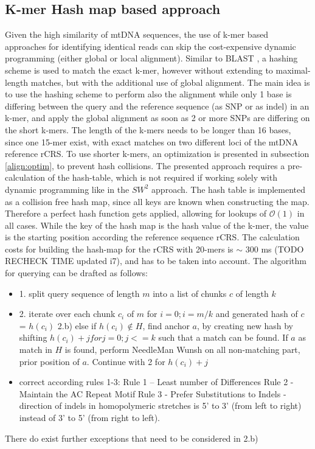 \subsection{K-mer Hash map based approach}
Given the high similarity of mtDNA sequences, the use of k-mer based approaches for identifying identical reads can skip the cost-expensive dynamic programming (either global or local alignment). Similar to BLAST \cite{Altschul1990}, a hashing scheme is used to match the exact k-mer, however without extending to maximal-length matches, but with the additional use of global alignment. The main idea is to use the hashing scheme to perform also the alignment while only 1 base is differing between the query and the reference sequence (as SNP or as indel) in an k-mer, and apply the global alignment as soon as 2 or more SNPs are differing on the short k-mers. The length of the k-mers needs to be longer than 16 bases, since one 15-mer exist, with exact matches on two different loci of the mtDNA reference rCRS. To use shorter k-mers, an optimization is presented in subsection \ref{align:optim}, to prevent hash collisions.
The presented approach requires a pre-calculation of the hash-table, which is not required if working solely with dynamic programming like in the $SW^{2}$ approach.
The hash table is implemented as a collision free hash map, since all keys are known when constructing the map. Therefore a perfect hash function gets applied, allowing for lookups of $\mathcal{O}(1)$ in all cases. While the key of the hash map is the hash value of the k-mer, the value is the starting position according the reference sequence rCRS. The calculation costs for building the hash-map for the rCRS with 20-mers is $\sim$ 300 ms (TODO RECHECK TIME updated i7), and has to be taken into account.
The algorithm for querying can be drafted as follows:
\begin{itemize}
\item 1. split query sequence of length $m$ into a list of chunks $c$ of length $k$
\item 2. iterate over each chunk $c_i$ of $m$ for $i=0; i= m/k$ and generated hash of $c$ = $h(c_i)$
\subitem 2.b) else if $h(c_i) \notin H$, find anchor $a$, by creating new hash by shifting    $h(c_i)+j for j =0; j<=k$ such that a match can be found. If $a$ as match in $H$ is found, perform NeedleMan Wunsh on all non-matching part, prior position of $a$. Continue with 2 for $h(c_i)+j$
\item correct according rules 1-3: 
\subitem  Rule 1 – Least number of Differences
\subitem Rule 2 - Maintain the AC Repeat Motif
\subitem Rule 3 -  Prefer Substitutions to Indels - direction of indels in homopolymeric stretches is  5’ to 3’ (from left to right) instead of 3’ to 5’ (from right to left). 
\end{itemize}
There do exist further exceptions that need to be considered in 2.b)  
